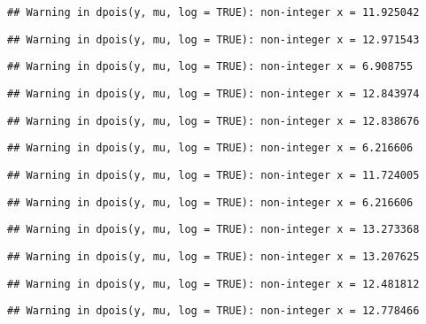 \documentclass[
]{article}
\begin{document}
\begin{verbatim}
## Warning in dpois(y, mu, log = TRUE): non-integer x = 11.925042
\end{verbatim}

\begin{verbatim}
## Warning in dpois(y, mu, log = TRUE): non-integer x = 12.971543
\end{verbatim}

\begin{verbatim}
## Warning in dpois(y, mu, log = TRUE): non-integer x = 6.908755
\end{verbatim}

\begin{verbatim}
## Warning in dpois(y, mu, log = TRUE): non-integer x = 12.843974
\end{verbatim}

\begin{verbatim}
## Warning in dpois(y, mu, log = TRUE): non-integer x = 12.838676
\end{verbatim}

\begin{verbatim}
## Warning in dpois(y, mu, log = TRUE): non-integer x = 6.216606
\end{verbatim}

\begin{verbatim}
## Warning in dpois(y, mu, log = TRUE): non-integer x = 11.724005
\end{verbatim}

\begin{verbatim}
## Warning in dpois(y, mu, log = TRUE): non-integer x = 6.216606
\end{verbatim}

\begin{verbatim}
## Warning in dpois(y, mu, log = TRUE): non-integer x = 13.273368
\end{verbatim}

\begin{verbatim}
## Warning in dpois(y, mu, log = TRUE): non-integer x = 13.207625
\end{verbatim}

\begin{verbatim}
## Warning in dpois(y, mu, log = TRUE): non-integer x = 12.481812
\end{verbatim}

\begin{verbatim}
## Warning in dpois(y, mu, log = TRUE): non-integer x = 12.778466
\end{verbatim}
\end{document}
